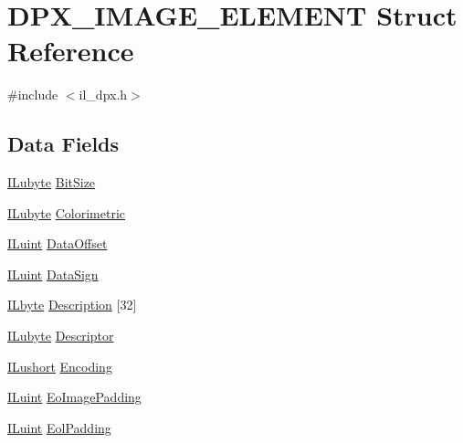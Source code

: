 \hypertarget{struct_d_p_x___i_m_a_g_e___e_l_e_m_e_n_t}{\section{D\-P\-X\-\_\-\-I\-M\-A\-G\-E\-\_\-\-E\-L\-E\-M\-E\-N\-T Struct Reference}
\label{struct_d_p_x___i_m_a_g_e___e_l_e_m_e_n_t}
}


{\ttfamily \#include $<$il\-\_\-dpx.\-h$>$}

\subsection*{Data Fields}
\begin{DoxyCompactItemize}
\item 
\hyperlink{il_8h_a8d2f04500100a86d1b00e98ab1b15a33}{I\-Lubyte} \hyperlink{struct_d_p_x___i_m_a_g_e___e_l_e_m_e_n_t_acafa8fc300b14f8f61bb2a40ded5b36d}{Bit\-Size}
\item 
\hyperlink{il_8h_a8d2f04500100a86d1b00e98ab1b15a33}{I\-Lubyte} \hyperlink{struct_d_p_x___i_m_a_g_e___e_l_e_m_e_n_t_a6ee25b5330ef86d51434e0f904d41e45}{Colorimetric}
\item 
\hyperlink{il_8h_ac6508d0e9c19e32f32e00d54b5b8cf30}{I\-Luint} \hyperlink{struct_d_p_x___i_m_a_g_e___e_l_e_m_e_n_t_a67fc34175ba8160960f984051ef7ce24}{Data\-Offset}
\item 
\hyperlink{il_8h_ac6508d0e9c19e32f32e00d54b5b8cf30}{I\-Luint} \hyperlink{struct_d_p_x___i_m_a_g_e___e_l_e_m_e_n_t_af4e4878fce25e4774a60fbfb40c5d51e}{Data\-Sign}
\item 
\hyperlink{il_8h_a88e562dacd22f4efcf6f9d31b85d4f92}{I\-Lbyte} \hyperlink{struct_d_p_x___i_m_a_g_e___e_l_e_m_e_n_t_a45465b6ed956dea9e77ffa113c570367}{Description} \mbox{[}32\mbox{]}
\item 
\hyperlink{il_8h_a8d2f04500100a86d1b00e98ab1b15a33}{I\-Lubyte} \hyperlink{struct_d_p_x___i_m_a_g_e___e_l_e_m_e_n_t_af5ca92055f6e8511087648fb3629aebe}{Descriptor}
\item 
\hyperlink{il_8h_af6287b43748354a7c4864da43ae56962}{I\-Lushort} \hyperlink{struct_d_p_x___i_m_a_g_e___e_l_e_m_e_n_t_a4197a176ff23acbd2ff808e2cf851371}{Encoding}
\item 
\hyperlink{il_8h_ac6508d0e9c19e32f32e00d54b5b8cf30}{I\-Luint} \hyperlink{struct_d_p_x___i_m_a_g_e___e_l_e_m_e_n_t_acfadaeb328175a09c197390620cce93d}{Eo\-Image\-Padding}
\item 
\hyperlink{il_8h_ac6508d0e9c19e32f32e00d54b5b8cf30}{I\-Luint} \hyperlink{struct_d_p_x___i_m_a_g_e___e_l_e_m_e_n_t_a1d230a1d7636309aa6aeb90b67f66a9f}{Eol\-Padding}

\end{DoxyCompactItemize}
